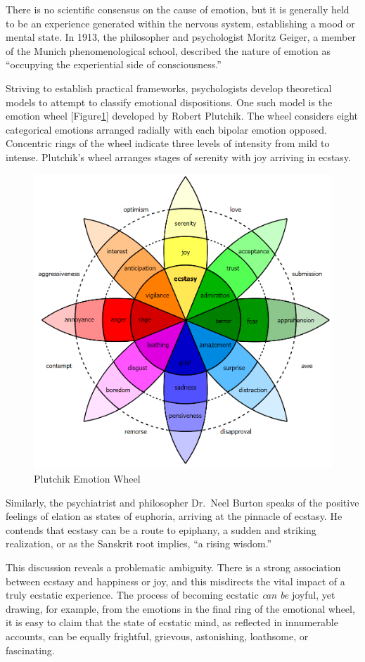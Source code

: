 \documentclass{UIdahoMastersThesis}
\begin{document}
There is no scientific consensus on the cause of emotion, but it is generally held to be an experience generated within the nervous system, establishing a mood or mental state. In 1913, the philosopher and psychologist Moritz Geiger, a member of the Munich phenomenological school, described the nature of emotion as ``occupying the experiential side of consciousness.\cite{mayer-gross_translation:_nodate}''   

Striving to establish practical frameworks, psychologists develop theoretical models to attempt to classify emotional dispositions. One such model is the emotion wheel [Figure\ref{fig:wheel}] developed by Robert Plutchik. The wheel considers eight categorical emotions arranged radially with each bipolar emotion opposed. Concentric rings of the wheel indicate three levels of intensity from mild to intense. Plutchik's wheel arranges stages of serenity with joy arriving in ecstasy.

\begin{figure}[h!]
	\centering
	\includegraphics[width=0.72\linewidth]{plutchik_wheel.png}
	\caption{Plutchik Emotion Wheel}
	\label{fig:wheel}
\end{figure}

Similarly, the psychiatrist and philosopher Dr.~Neel Burton speaks of the positive feelings of elation as states of euphoria, arriving at the pinnacle of ecstasy. He contends that ecstasy can be a route to epiphany, a sudden and striking realization, or as the Sanskrit root implies, ``a rising wisdom\cite{burton_heaven_2015}.''

This discussion reveals a problematic ambiguity. There is a strong association between ecstasy and happiness or joy, and this misdirects the vital impact of a truly ecstatic experience. The process of becoming ecstatic \emph{can be} joyful, yet drawing, for example, from the emotions in the final ring of the emotional wheel, it is easy to claim that the state of ecstatic mind, as reflected in innumerable accounts, can be equally frightful, grievous, astonishing, loathsome, or fascinating.
\end{document}

